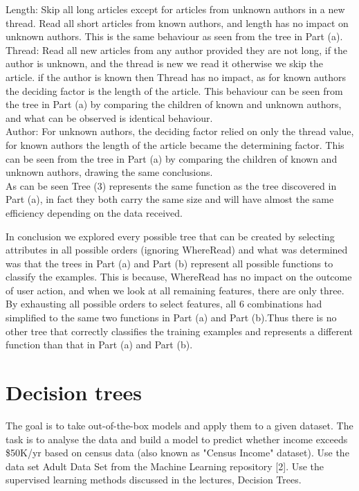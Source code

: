 \documentclass{article}
\begin{document}
\begin{enumerate}[(a)]
Length: Skip all long articles except for articles from unknown authors in a new thread. Read all short articles from known authors, and length has no impact on unknown authors. This is the same behaviour as seen from the tree in Part (a).\\

Thread: Read all new articles from any author provided they are not long, if the author is unknown, and the thread is new we read it otherwise we skip the article. if the author is known then Thread has no impact, as for known authors the deciding factor is the length of the article. This behaviour can be seen from the tree in Part (a) by comparing the children of known and unknown authors, and what can be observed is identical behaviour.\\

Author: For unknown authors, the deciding factor relied on only the thread value, for known authors the length of the article became the determining factor. This can be seen from the tree in Part (a) by comparing the children of known and unknown authors, drawing the same conclusions.\\

As can be seen Tree (3) represents the same function as the tree discovered in Part (a), in fact they both carry the same size and will have almost the same efficiency depending on the data received.

In conclusion we explored every possible tree that can be created by selecting attributes in all possible orders (ignoring WhereRead) and what was determined was that the trees in Part (a) and Part (b) represent all possible functions to classify the examples. This is because, WhereRead has no impact on the outcome of user action, and when we look at all remaining features, there are only three. By exhausting all possible orders to select features, all 6 combinations had simplified to the same two functions in Part (a) and Part (b).Thus there is no other tree that correctly classifies the training examples and represents a different function than that in Part (a) and Part (b).
\end{enumerate}

\newpage
\section{Decision trees}
The goal is to take out-of-the-box models and apply them to a given dataset. The task is to analyse the data and build a model to predict whether income exceeds \$50K/yr based on census data (also known as "Census Income" dataset). Use the data set Adult Data Set from the Machine Learning repository [2]. Use the supervised learning methods discussed in the lectures, Decision Trees.
\end{document}
